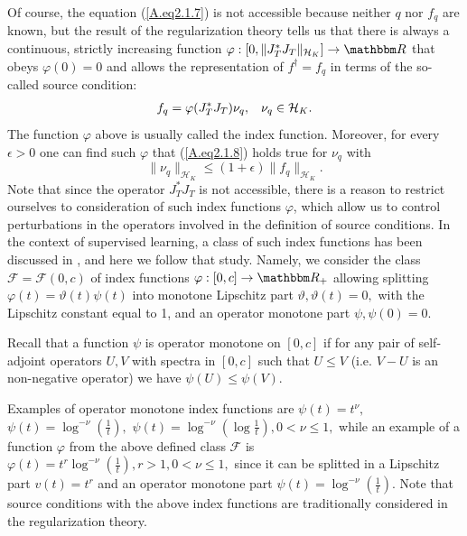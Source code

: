\documentclass[USenglish]{article}
\def\R{\mathbbm R}
\begin{document}
	Of course, the equation (\ref{A.eq2.1.7}) is not accessible because neither $q$ nor $f_q$ are known, but the result \cite{mathe2008} of the regularization theory tells us that there is always a continuous, strictly increasing function $ \varphi : [0,\|J_T^* J_T \|_{\mathcal{H}_K} ] \rightarrow \R$ that obeys $\varphi (0) = 0 $ and allows the representation of $f^\dagger = f_q$ in terms of the so-called source condition:
	\begin{align}\label{A.eq2.1.8}
	f_q = \varphi (J_T^* J_T ) \nu_q, \hspace*{0.3cm} \nu_q \in {\mathcal{H}_K}.
	\end{align}
	The function $\varphi$ above is usually called the index function. Moreover, for every $\epsilon > 0$ one can find such $\varphi$ that (\ref{A.eq2.1.8}) holds true for $\nu_q$ with $$\|\nu_q\|_{\mathcal{H}_K} \leq (1 + \epsilon) \|f_q\|_{\mathcal{H}_K}. $$
	Note that since the operator $J_T^* J_T$ is not accessible, there is a reason to restrict ourselves to consideration of such index functions $\varphi$, which allow us to control perturbations in the operators involved in the definition of source conditions. In the context of supervised learning, a class of such index functions has been discussed in \cite{bauer2007}, and here we follow that study. Namely, we consider the class $\mathcal{F} = \mathcal{F} (0,c)$ of index functions $\varphi : [0,c] \rightarrow \R_+$ allowing splitting $\varphi (t) = \vartheta(t) \psi (t)$ into monotone Lipschitz part $\vartheta, \vartheta(t) = 0,$ with the Lipschitz constant equal to 1, and an operator monotone part $\psi, \psi(0)= 0.$ 
	
	Recall that a function $\psi$ is operator monotone on $[0,c]$ if for any pair of self-adjoint operators $U, V$ with spectra in $[0,c]$ such that $U \leq V$ (i.e. $V - U$ is an non-negative operator) we have $\psi (U) \leq \psi (V)$.
	
	Examples of operator monotone index functions are $\psi (t) = t^\nu,$ $\psi (t) = \log^{-\nu} \left( \frac{1}{t} \right),$ $\psi (t) = \log^{-\nu} \left( \log \frac{1}{t} \right), 0 < \nu  \leq 1,$ while an example of a function $\varphi$ from the above defined class $\mathcal{F}$ is $\varphi(t) = t^r \log^{-\nu} \left( \frac{1}{t} \right), r > 1, 0 < \nu \leq 1,$  since it can be splitted in a Lipschitz part $v(t) = t^r$ and an operator monotone part $\psi (t) = \log^{-\nu} \left( \frac{1}{t} \right).$ Note that source conditions with the above index functions are traditionally considered in the regularization theory. 
\end{document}
